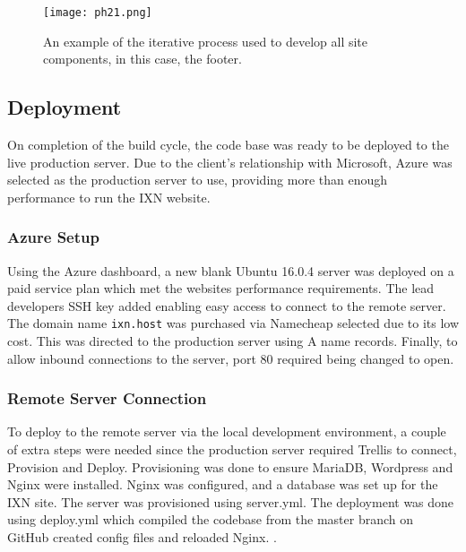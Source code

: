\documentclass[fontsize=11pt]{extarticle}
\numberwithin{figure}{section} %
\numberwithin{table}{section}%
\begin{document}
\begin{figure}[H]
      \centering
      \texttt{[image: ph21.png]}
      \caption{An example of the iterative process used to develop all site components, in this case, the footer.}
\label{buildcycleimg}
 \end{figure}

\hypertarget{deployment}{%
\subsection{Deployment}\label{deployment}}

On completion of the build cycle, the code base was ready to be deployed
to the live production server. Due to the client's relationship with
Microsoft, Azure was selected as the production server to use, providing
more than enough performance to run the IXN website.

\hypertarget{azure-setup}{%
\subsubsection{Azure Setup}\label{azure-setup}}

Using the Azure dashboard, a new blank Ubuntu 16.0.4 server was deployed
on a paid service plan which met the websites performance requirements.
The lead developers SSH key added enabling easy access to connect to the
remote server. The domain name \texttt{ixn.host} was purchased via
Namecheap selected due to its low cost. This was directed to the
production server using A name records. Finally, to allow inbound
connections to the server, port 80 required being changed to open.

\hypertarget{remote-server-connection}{%
\subsubsection{Remote Server
Connection}\label{remote-server-connection}}

To deploy to the remote server via the local development environment, a
couple of extra steps were needed since the production server required
Trellis to connect, Provision and Deploy. Provisioning was done to
ensure MariaDB, Wordpress and Nginx were installed. Nginx was
configured, and a database was set up for the IXN site. The server was
provisioned using server.yml. The deployment was done using deploy.yml
which compiled the codebase from the master branch on GitHub created
config files and reloaded Nginx. \cite{p23}.
\end{document}

